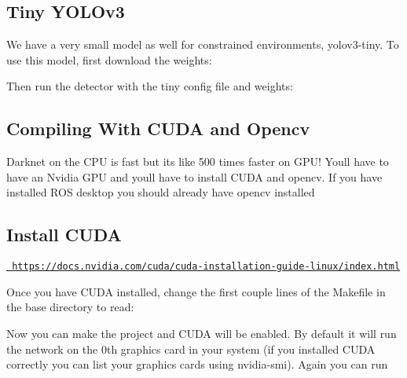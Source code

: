 \subsection*{Tiny Y\+O\+L\+Ov3}

We have a very small model as well for constrained environments, {\ttfamily yolov3-\/tiny}. To use this model, first download the weights\+:


\begin{DoxyCode}{0}
\end{DoxyCode}
 Then run the detector with the tiny config file and weights\+:


\begin{DoxyCode}{0}
\end{DoxyCode}
 \subsection*{Compiling With C\+U\+DA and Opencv}

Darknet on the C\+PU is fast but it\textquotesingle{}s like 500 times faster on G\+P\+U! You\textquotesingle{}ll have to have an Nvidia G\+PU and you\textquotesingle{}ll have to install C\+U\+DA and opencv. If you have installed R\+OS desktop you should already have opencv installed

\subsection*{Install C\+U\+DA}

\href{https://docs.nvidia.com/cuda/cuda-installation-guide-linux/index.html}{\texttt{ https\+://docs.\+nvidia.\+com/cuda/cuda-\/installation-\/guide-\/linux/index.\+html}}

Once you have C\+U\+DA installed, change the first couple lines of the Makefile in the base directory to read\+:


\begin{DoxyCode}{0}
\end{DoxyCode}
 Now you can make the project and C\+U\+DA will be enabled. By default it will run the network on the 0th graphics card in your system (if you installed C\+U\+DA correctly you can list your graphics cards using {\ttfamily nvidia-\/smi}). Again you can run


\begin{DoxyCode}{0}
\end{DoxyCode}
